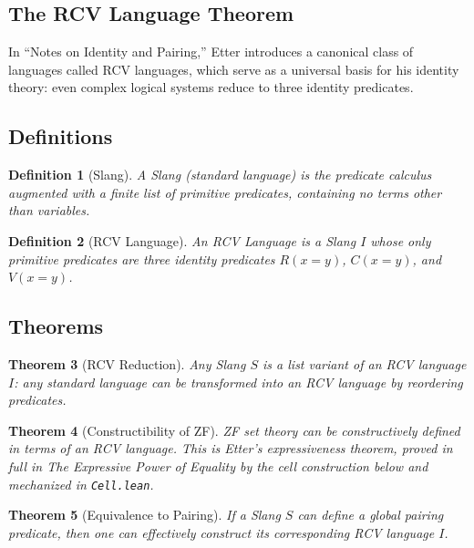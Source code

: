 \documentclass[11pt, a4paper]{article}
\newtheorem{theorem}{Theorem}[section]
\newtheorem{definition}[theorem]{Definition}
\theoremstyle{remark}
\begin{document}
\begin{appendices}
\section{The RCV Language Theorem}
\label{app:rcv}

In ``Notes on Identity and Pairing,'' Etter introduces a canonical class of languages called RCV languages, which serve as a universal basis for his identity theory: even complex logical systems reduce to three identity predicates.

\subsection{Definitions}

\begin{definition}[Slang]
A \emph{Slang} (standard language) is the predicate calculus augmented with a finite list of primitive predicates, containing no terms other than variables.
\end{definition}

\begin{definition}[RCV Language]
An \emph{RCV Language} is a Slang $I$ whose only primitive predicates are three identity predicates $R(x{=}y)$, $C(x{=}y)$, and $V(x{=}y)$.
\end{definition}

\subsection{Theorems}

\begin{theorem}[RCV Reduction]
Any Slang $S$ is a list variant of an RCV language $I$: any standard language can be transformed into an RCV language by reordering predicates.
\end{theorem}

\begin{theorem}[Constructibility of ZF]
ZF set theory can be constructively defined in terms of an RCV language. This is Etter's expressiveness theorem, proved in full in \emph{The Expressive Power of Equality}\cite{etter_power} by the cell construction below and mechanized in \texttt{Cell.lean}.
\end{theorem}

\begin{theorem}[Equivalence to Pairing]
If a Slang $S$ can define a global pairing predicate, then one can effectively construct its corresponding RCV language $I$.
\end{theorem}


\end{appendices}
\end{document}
